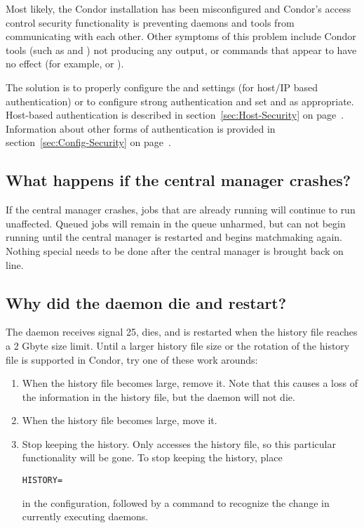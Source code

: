 Most likely, the Condor installation has been misconfigured
and Condor's access control security functionality is preventing
daemons and tools from communicating with each other.
Other symptoms of this problem include Condor tools (such as
 and ) not producing any output, or commands
that appear to have no effect (for example,  or
). 

The solution is to properly configure the  and
 settings (for host/IP based authentication) or to
configure strong authentication and set  and
 as appropriate.
Host-based authentication is described in
section~\ref{sec:Host-Security} on page~\pageref{sec:Host-Security}.
Information about other forms of authentication is provided in 
section~\ref{sec:Config-Security} on page~\pageref{sec:Config-Security}.

\subsection*{What happens if the central manager crashes?}

If the central manager crashes, jobs that are already running will
continue to run unaffected.
Queued jobs will remain in the queue unharmed, but can not begin
running until the central manager is restarted and begins matchmaking
again.
Nothing special needs to be done after the central manager is brought
back on line.

\subsection*{Why did the  daemon die and restart?}

The  daemon receives signal 25,
dies, and is restarted when the
history file reaches a 2 Gbyte size limit.
Until a larger history file size or the rotation of the history
file is supported in Condor,
try one of these work arounds:

\begin{enumerate}
\item When the history file becomes large, remove it.
Note that this causes a loss of the information in the history file,
but the  daemon will not die.
\item When the history file becomes large, move it.
\item Stop keeping the history.
Only  accesses the history file, 
so this particular functionality will be gone.
To stop keeping the history, place
\begin{verbatim}
HISTORY=
\end{verbatim}
in the configuration,
followed by a  command to recognize the change in
currently executing daemons.
\end{enumerate}

